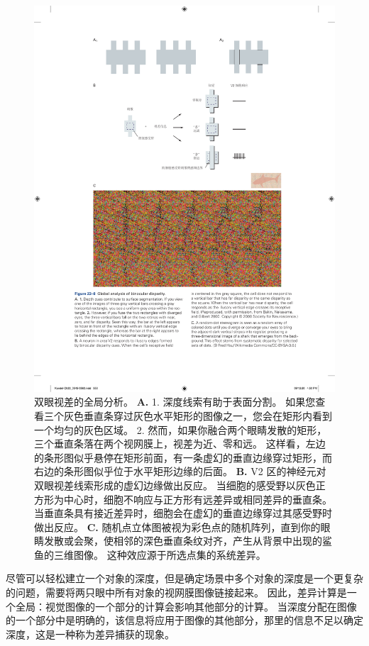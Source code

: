 \begin{figure}[htbp]
	\centering
	\includegraphics[width=0.95\linewidth]{chap23/fig_23_8}
	\caption{双眼视差的全局分析。
		\textbf{A.} 1. 深度线索有助于表面分割。
		如果您查看三个灰色垂直条穿过灰色水平矩形的图像之一，您会在矩形内看到一个均匀的灰色区域。
		2. 然而，如果你融合两个眼睛发散的矩形，三个垂直条落在两个视网膜上，视差为近、零和远。
		这样看，左边的条形图似乎悬停在矩形前面，有一条虚幻的垂直边缘穿过矩形，而右边的条形图似乎位于水平矩形边缘的后面。
		\textbf{B.} V2 区的神经元对双眼视差线索形成的虚幻边缘做出反应。
		当细胞的感受野以灰色正方形为中心时，细胞不响应与正方形有远差异或相同差异的垂直条。
		当垂直条具有接近差异时，细胞会在虚幻的垂直边缘穿过其感受野时做出反应\cite{bakin2000visual}。
		\textbf{C.} 随机点立体图被视为彩色点的随机阵列，直到你的眼睛发散或会聚，使相邻的深色垂直条纹对齐，产生从背景中出现的鲨鱼的三维图像。
		这种效应源于所选点集的系统差异。}
	\label{fig:23_8}
\end{figure}


尽管可以轻松建立一个对象的深度，但是确定场景中多个对象的深度是一个更复杂的问题，需要将两只眼中所有对象的视网膜图像链接起来。
因此，差异计算是一个全局：视觉图像的一个部分的计算会影响其他部分的计算。
当深度分配在图像的一个部分中是明确的，该信息将应用于图像的其他部分，那里的信息不足以确定深度，这是一种称为差异捕获的现象。


